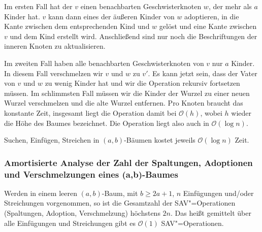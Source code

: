 Im ersten Fall hat der $v$ einen benachbarten Geschwisterknoten $w$, der mehr als $a$ Kinder hat. $v$ kann dann eines der äußeren Kinder von $w$ adoptieren, in die Kante zwischen dem entsprechenden Kind und $w$ gelöst und eine Kante zwischen $v$ und dem Kind erstellt wird. Anschließend sind nur noch die Beschriftungen der inneren Knoten zu aktualisieren.

Im zweiten Fall haben alle benachbarten Geschwisterknoten von $v$ nur $a$ Kinder. In diesem Fall verschmelzen wir $v$ und $w$ zu $v'$. Es kann jetzt sein, dass der Vater von $v$ und $w$ zu wenig Kinder hat und wir die Operation rekursiv fortsetzen müssen. Im schlimmsten Fall müssen wir die Kinder der Wurzel zu einer neuen Wurzel verschmelzen und die alte Wurzel entfernen. Pro Knoten braucht das konstante Zeit, insgesamt liegt die Operation damit bei $\mathcal{O}(h)$, wobei $h$ wieder die Höhe des Baumes bezeichnet. Die Operation liegt also auch in $\mathcal{O}(\log n)$.

\begin{Satz}
  \hspace{\parindent}Suchen, Einfügen, Streichen in $(a,b)$-Bäumen kostet jeweils $\mathcal{O}(\log n)$ Zeit.
\end{Satz}

\subsubsection{Amortisierte Analyse der Zahl der Spaltungen, Adoptionen und Verschmelzungen eines (a,b)-Baumes}
\begin{Beh}
  \hspace{\parindent}Werden in einem leeren $(a,b)$-Baum, mit $b \ge 2a + 1$, $n$ Einfügungen und/oder Streichungen vorgenommen, so ist die Gesamtzahl der SAV"=Operationen (Spaltungen, Adoption, Verschmelzung) höchstens $2n$. Das heißt gemittelt über alle Einfügungen und Streichungen gibt es $\mathcal{O}(1)$ SAV"=Operationen.
\end{Beh}

